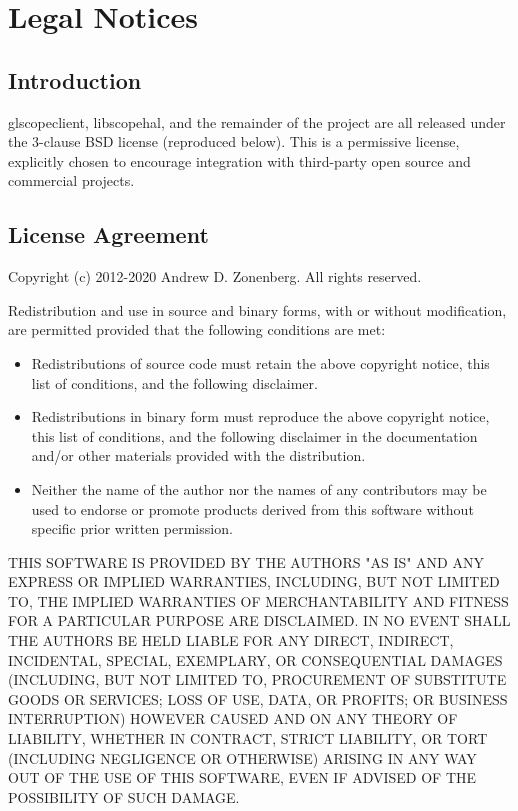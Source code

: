 \chapter{Legal Notices}

\section{Introduction}

glscopeclient, libscopehal, and the remainder of the project are all released under the 3-clause BSD license
(reproduced below). This is a permissive license, explicitly chosen to encourage integration with third-party open
source and commercial projects.

\section{License Agreement}

Copyright (c) 2012-2020 Andrew D. Zonenberg.
All rights reserved.

Redistribution and use in source and binary forms, with or without modification, are permitted provided that the
following conditions are met:
\begin{itemize}
\item Redistributions of source code must retain the above copyright notice, this list of conditions, and the
following disclaimer.
\item Redistributions in binary form must reproduce the above copyright notice, this list of conditions, and the
following disclaimer in the documentation and/or other materials provided with the distribution.
\item Neither the name of the author nor the names of any contributors may be used to endorse or promote products
derived from this software without specific prior written permission.
\end{itemize}

THIS SOFTWARE IS PROVIDED BY THE AUTHORS "AS IS" AND ANY EXPRESS OR IMPLIED WARRANTIES, INCLUDING, BUT NOT LIMITED
TO, THE IMPLIED WARRANTIES OF MERCHANTABILITY AND FITNESS FOR A PARTICULAR PURPOSE ARE DISCLAIMED. IN NO EVENT SHALL
THE AUTHORS BE HELD LIABLE FOR ANY DIRECT, INDIRECT, INCIDENTAL, SPECIAL, EXEMPLARY, OR CONSEQUENTIAL DAMAGES
(INCLUDING, BUT NOT LIMITED TO, PROCUREMENT OF SUBSTITUTE GOODS OR SERVICES; LOSS OF USE, DATA, OR PROFITS; OR
BUSINESS INTERRUPTION) HOWEVER CAUSED AND ON ANY THEORY OF LIABILITY, WHETHER IN CONTRACT, STRICT LIABILITY, OR TORT
(INCLUDING NEGLIGENCE OR OTHERWISE) ARISING IN ANY WAY OUT OF THE USE OF THIS SOFTWARE, EVEN IF ADVISED OF THE
POSSIBILITY OF SUCH DAMAGE.

